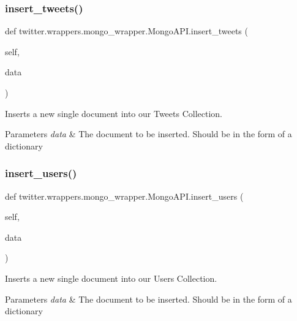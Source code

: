 \subsubsection{\texorpdfstring{insert\+\_\+tweets()}{insert\_tweets()}}
{\footnotesize\ttfamily def twitter.\+wrappers.\+mongo\+\_\+wrapper.\+Mongo\+A\+P\+I.\+insert\+\_\+tweets (\begin{DoxyParamCaption}\item[{}]{self,  }\item[{}]{data }\end{DoxyParamCaption})}



Inserts a new single document into our Tweets Collection. 


\begin{DoxyParams}{Parameters}
{\em data} & The document to be inserted. Should be in the form of a dictionary \\
\hline
\end{DoxyParams}
\mbox{\label{classtwitter_1_1wrappers_1_1mongo__wrapper_1_1MongoAPI_a3f6edee30773ed114e48e32d54d45574}} 
\subsubsection{\texorpdfstring{insert\+\_\+users()}{insert\_users()}}
{\footnotesize\ttfamily def twitter.\+wrappers.\+mongo\+\_\+wrapper.\+Mongo\+A\+P\+I.\+insert\+\_\+users (\begin{DoxyParamCaption}\item[{}]{self,  }\item[{}]{data }\end{DoxyParamCaption})}



Inserts a new single document into our Users Collection. 


\begin{DoxyParams}{Parameters}
{\em data} & The document to be inserted. Should be in the form of a dictionary \\
\hline
\end{DoxyParams}
\mbox{\label{classtwitter_1_1wrappers_1_1mongo__wrapper_1_1MongoAPI_aba0464a1d64aee45155401dd766d0d7e}} 
